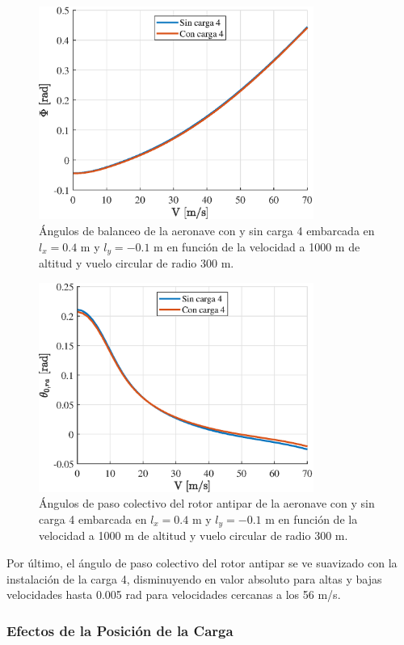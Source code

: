 \begin{figure}
	\centering
	\includegraphics[width=90mm]{graficos/BalanVCSP}
	\caption{Ángulos de balanceo de la aeronave con y sin carga 4 embarcada en $l_x=0.4$ m y $l_y=-0.1$ m en función de la velocidad a 1000 m de altitud y vuelo circular de radio 300 m.}
	\label{PhiVCSP}
\end{figure}
\begin{figure}
	\centering
 	\includegraphics[width=90mm]{graficos/theta0raVCSP}
	\caption{Ángulos de paso colectivo del rotor antipar de la aeronave con y sin carga 4 embarcada en $l_x=0.4$ m y $l_y=-0.1$ m en función de la velocidad a 1000 m de altitud y vuelo circular de radio 300 m.}
	\label{Theta0raVCSP}
\end{figure}

Por último, el ángulo de paso colectivo del rotor antipar se ve suavizado con la instalación de la carga 4, disminuyendo en valor absoluto para altas y bajas velocidades hasta 0.005 rad para velocidades cercanas a los 56 m/s.


\subsubsection*{Efectos de la Posición de la Carga}

